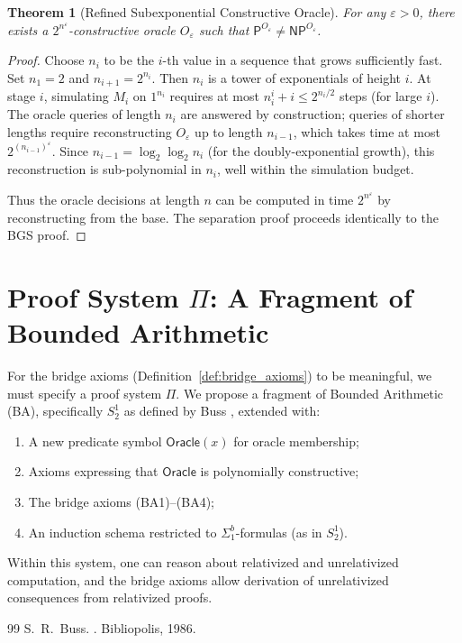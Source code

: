 \documentclass[11pt,a4paper]{article}
\theoremstyle{plain}
\newtheorem{theorem}{Theorem}[section]
\theoremstyle{definition}
\theoremstyle{remark}
\newcommand{\PP}{\mathsf{P}}
\newcommand{\NP}{\mathsf{NP}}
\begin{document}
\begin{theorem}[Refined Subexponential Constructive Oracle]
For any $\varepsilon > 0$, there exists a $2^{n^{\varepsilon}}$-constructive
oracle $O_{\varepsilon}$ such that $\PP^{O_{\varepsilon}} \neq \NP^{O_{\varepsilon}}$.
\end{theorem}
\begin{proof}
Choose $n_i$ to be the $i$-th value in a sequence that grows sufficiently fast.
Set $n_1 = 2$ and $n_{i+1} = 2^{n_i}$.  Then $n_i$ is a tower of exponentials of
height $i$.  At stage $i$, simulating $M_i$ on $1^{n_i}$ requires at most
$n_i^{i} + i \leq 2^{n_i/2}$ steps (for large $i$).  The oracle queries of length
$n_i$ are answered by construction; queries of shorter lengths require
reconstructing $O_{\varepsilon}$ up to length $n_{i-1}$, which takes time at most
$2^{(n_{i-1})^{\varepsilon}}$.  Since $n_{i-1} = \log_2 \log_2 n_i$ (for the
doubly-exponential growth), this reconstruction is sub-polynomial in $n_i$, well
within the simulation budget.

Thus the oracle decisions at length $n$ can be computed in time
$2^{n^{\varepsilon}}$ by reconstructing from the base.  The separation proof
proceeds identically to the BGS proof.
\end{proof}

\section{Proof System $\Pi$: A Fragment of Bounded Arithmetic}\label{app:proofsys}

For the bridge axioms (Definition~\ref{def:bridge_axioms}) to be meaningful, we
must specify a proof system $\Pi$.  We propose a fragment of Bounded Arithmetic
(BA), specifically $S_2^1$ as defined by Buss \cite{Buss86}, extended with:

\begin{enumerate}[label=(\roman*)]
    \item A new predicate symbol $\mathsf{Oracle}(x)$ for oracle membership;
    \item Axioms expressing that $\mathsf{Oracle}$ is polynomially constructive;
    \item The bridge axioms (BA1)--(BA4);
    \item An induction schema restricted to $\Sigma_1^b$-formulas (as in $S_2^1$).
\end{enumerate}

Within this system, one can reason about relativized and unrelativized
computation, and the bridge axioms allow derivation of unrelativized
consequences from relativized proofs.

\begin{thebibliography}{99}
S.~R.~Buss.
.
\newblock Bibliopolis, 1986.
\end{thebibliography}
\end{document}
